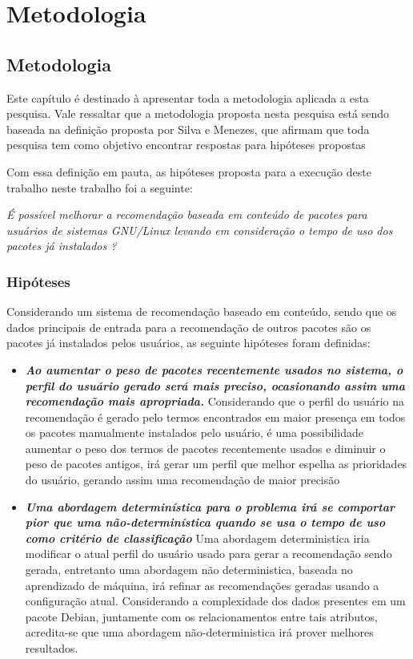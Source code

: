 \part{Metodologia}

\chapter[Metodologia]{Metodologia}

Este capítulo é destinado à apresentar toda a metodologia aplicada a esta
pesquisa. Vale ressaltar que a metodologia proposta nesta pesquisa está sendo
baseada na definição proposta por Silva e Menezes, que afirmam que toda pesquisa
tem como objetivo encontrar respostas para hipóteses propostas
\cite{da2005metodologia}

Com essa definição em pauta, as hipóteses proposta para a execução deste trabalho neste trabalho foi a seguinte:

\begin{center}
\textit{É possível melhorar a recomendação baseada em conteúdo de pacotes para usuários de sistemas GNU/Linux levando em consideração o tempo de uso dos pacotes já instalados ?}
\end{center}

\section{Hipóteses}

Considerando um sistema de recomendação baseado em conteúdo, sendo que os dados principais de entrada para a recomendação de outros pacotes são os pacotes já instalados pelos usuários, as seguinte hipóteses foram definidas:

\begin{itemize}
    \item \textit{\textbf{Ao aumentar o peso de pacotes recentemente usados no sistema, o perfil do usuário gerado será mais preciso, ocasionando assim uma recomendação mais apropriada.}} Considerando que o perfil do usuário na recomendação é gerado pelo termos encontrados em maior presença em todos os pacotes manualmente instalados pelo usuário, é uma possibilidade aumentar o peso dos termos de pacotes recentemente usados e diminuir o peso de pacotes antigos, irá gerar um perfil que melhor espelha as prioridades do usuário, gerando assim uma recomendação de maior precisão
    \item \textit{\textbf{Uma abordagem determinística para o problema irá se comportar pior que uma não-determinística quando se usa o tempo de uso como critério de classificação}} Uma abordagem deterministica iria modificar o atual perfil do usuário usado para gerar a recomendação sendo gerada, entretanto uma abordagem não deterministica, baseada no aprendizado de máquina, irá refinar as recomendações geradas usando a configuração atual. Considerando a complexidade dos dados presentes em um pacote Debian, juntamente com os relacionamentos entre tais atributos, acredita-se que uma abordagem não-deterministica irá prover melhores resultados.
\end{itemize}

